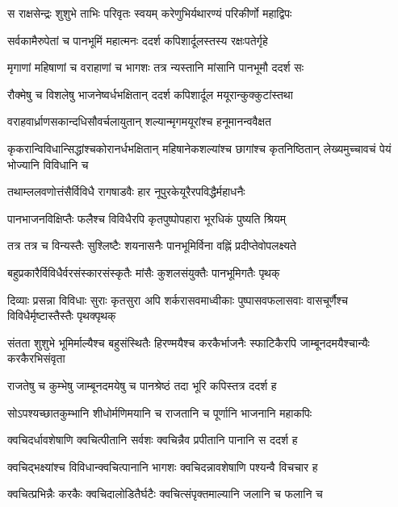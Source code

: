 \twolineshloka
{स राक्षसेन्द्रः शुशुभे ताभिः परिवृतः स्वयम्}
{करेणुभिर्यथारण्यं परिकीर्णो महाद्विपः} %

\twolineshloka
{सर्वकामैरुपेतां च पानभूमिं महात्मनः}
{ददर्श कपिशार्दूलस्तस्य रक्षःपतेर्गृहे} %

\twolineshloka
{मृगाणां महिषाणां च वराहाणां च भागशः}
{तत्र न्यस्तानि मांसानि पानभूमौ ददर्श सः} %

\twolineshloka
{रौक्मेषु च विशलेषु भाजनेष्वर्धभक्षितान्}
{ददर्श कपिशार्दूल मयूरान्कुक्कुटांस्तथा} %

\twolineshloka
{वराहवार्ध्राणसकान्दधिसौवर्चलायुतान्}
{शल्यान्मृगमयूरांश्च हनूमानन्ववैक्षत} %

\threelineshloka
{कृकरान्विविधान्सिद्धांश्चकोरानर्धभक्षितान्}
{महिषानेकशल्यांश्च छागांश्च कृतनिष्ठितान्}
{लेख्यमुच्चावचं पेयं भोज्यानि विविधानि च} %

\twolineshloka
{तथाम्ललवणोत्तंसैर्विविधै रागषाडवैः}
{हार नूपुरकेयूरैरपविद्धैर्महाधनैः} %

\twolineshloka
{पानभाजनविक्षिप्तैः फलैश्च विविधैरपि}
{कृतपुष्पोपहारा भूरधिकं पुष्यति श्रियम्} %

\twolineshloka
{तत्र तत्र च विन्यस्तैः सुश्लिष्टैः शयनासनैः}
{पानभूमिर्विना वह्निं प्रदीप्तेवोपलक्ष्यते} %

\twolineshloka
{बहुप्रकारैर्विविधैर्वरसंस्कारसंस्कृतैः}
{मांसैः कुशलसंयुक्तैः पानभूमिगतैः पृथक्} %

\threelineshloka
{दिव्याः प्रसन्ना विविधाः सुराः कृतसुरा अपि}
{शर्करासवमाध्वीकाः पुष्पासवफलासवाः}
{वासचूर्णैश्च विविधैर्मृष्टास्तैस्तैः पृथक्पृथक्} %

\threelineshloka
{संतता शुशुभे भूमिर्माल्यैश्च बहुसंस्थितैः}
{हिरण्मयैश्च करकैर्भाजनैः स्फाटिकैरपि}
{जाम्बूनदमयैश्चान्यैः करकैरभिसंवृता} %

\twolineshloka
{राजतेषु च कुम्भेषु जाम्बूनदमयेषु च}
{पानश्रेष्ठं तदा भूरि कपिस्तत्र ददर्श ह} %

\twolineshloka
{सोऽपश्यच्छातकुम्भानि शीधोर्मणिमयानि च}
{राजतानि च पूर्णानि भाजनानि महाकपिः} %

\twolineshloka
{क्वचिदर्धावशेषाणि क्वचित्पीतानि सर्वशः}
{क्वचिन्नैव प्रपीतानि पानानि स ददर्श ह} %

\twolineshloka
{क्वचिद्भक्ष्यांश्च विविधान्क्वचित्पानानि भागशः}
{क्वचिदन्नावशेषाणि पश्यन्वै विचचार ह} %

\twolineshloka
{क्वचित्प्रभिन्नैः करकैः क्वचिदालोडितैर्घटैः}
{क्वचित्संपृक्तमाल्यानि जलानि च फलानि च} %

